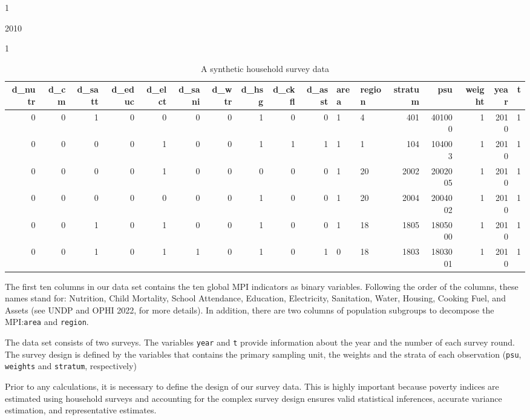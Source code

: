 1

2010

1

\begin{table}

\caption{\label{tab:svydata-tab-static}A synthetic household survey data}
\centering
\fontsize{7}{9}\selectfont
\begin{tabular}[t]{r|r|r|r|r|r|r|r|r|r|l|l|r|r|r|r|r}
\hline
d\_nutr & d\_cm & d\_satt & d\_educ & d\_elct & d\_sani & d\_wtr & d\_hsg & d\_ckfl & d\_asst & area & region & stratum & psu & weight & year & t\\
\hline
0 & 0 & 1 & 0 & 0 & 0 & 0 & 1 & 0 & 0 & 1 & 4 & 401 & 401000 & 1 & 2010 & 1\\
\hline
0 & 0 & 0 & 0 & 1 & 0 & 0 & 1 & 1 & 1 & 1 & 1 & 104 & 104003 & 1 & 2010 & 1\\
\hline
0 & 0 & 0 & 0 & 1 & 0 & 0 & 0 & 0 & 0 & 1 & 20 & 2002 & 2002005 & 1 & 2010 & 1\\
\hline
0 & 0 & 0 & 0 & 0 & 0 & 0 & 1 & 0 & 0 & 1 & 20 & 2004 & 2004002 & 1 & 2010 & 1\\
\hline
0 & 0 & 1 & 0 & 1 & 0 & 0 & 1 & 0 & 0 & 1 & 18 & 1805 & 1805000 & 1 & 2010 & 1\\
\hline
0 & 0 & 1 & 0 & 1 & 1 & 0 & 1 & 0 & 1 & 0 & 18 & 1803 & 1803001 & 1 & 2010 & 1\\
\hline
\end{tabular}
\end{table}

The first ten columns in our data set contains the ten global MPI
indicators as binary variables. Following the order of the columns,
these names stand for: Nutrition, Child Mortality, School Attendance,
Education, Electricity, Sanitation, Water, Housing, Cooking Fuel, and
Assets (see UNDP and OPHI 2022, for more details). In addition, there are
two columns of population subgroups to decompose the MPI:\texttt{area} and
\texttt{region}.

The data set consists of two surveys. The variables \texttt{year} and \texttt{t}
provide information about the year and the number of each survey round.
The survey design is defined by the variables that contains the primary
sampling unit, the weights and the strata of each observation (\texttt{psu},
\texttt{weights} and \texttt{stratum}, respectively)

Prior to any calculations, it is necessary to define the design of our
survey data. This is highly important because poverty indices are
estimated using household surveys and accounting for the complex
survey design ensures valid statistical inferences, accurate variance
estimation, and representative estimates.

